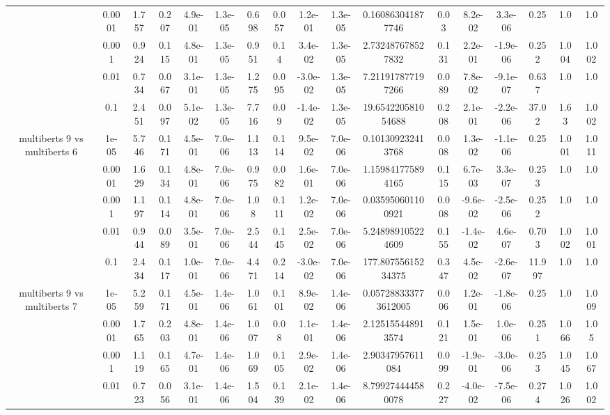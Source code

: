\begin{tabular}{|c|c|c|c|c|c|c|c|c|c|c|c|c|c|c|c|c|}
 & 0.0001 & 1.757 & 0.207 & 4.9e-01 & 1.3e-05 & 0.698 & 0.057 & 1.2e-01 & 1.3e-05 & 0.160863041877746 & 0.03 & 8.2e-02 & 3.3e-06 & 0.25 & 1.0 & 1.0 \\
 & 0.001 & 0.924 & 0.115 & 4.8e-01 & 1.3e-05 & 0.951 & 0.14 & 3.4e-02 & 1.3e-05 & 2.732487678527832 & 0.131 & 2.2e-01 & -1.9e-06 & 0.252 & 1.004 & 1.002 \\
 & 0.01 & 0.734 & 0.067 & 3.1e-01 & 1.3e-05 & 1.275 & 0.095 & -3.0e-02 & 1.3e-05 & 7.211917877197266 & 0.089 & 7.8e-02 & -9.1e-07 & 0.637 & 1.0 & 1.0 \\
 & 0.1 & 2.451 & 0.097 & 5.1e-02 & 1.3e-05 & 7.716 & 0.09 & -1.4e-02 & 1.3e-05 & 19.654220581054688 & 0.208 & 2.1e-01 & -2.2e-06 & 37.02 & 1.63 & 1.002 \\
\hline
\multirow{5}{*}{multiberts 9 vs multiberts 6} & 1e-05 & 5.746 & 0.171 & 4.5e-01 & 7.0e-06 & 1.113 & 0.114 & 9.5e-02 & 7.0e-06 & 0.101309232413768 & 0.008 & 1.3e-02 & -1.1e-06 & 0.25 & 1.001 & 1.011 \\
 & 0.0001 & 1.629 & 0.134 & 4.8e-01 & 7.0e-06 & 0.975 & 0.082 & 1.6e-01 & 7.0e-06 & 1.159841775894165 & 0.115 & 6.7e-03 & 3.3e-07 & 0.253 & 1.0 & 1.0 \\
 & 0.001 & 1.197 & 0.114 & 4.8e-01 & 7.0e-06 & 1.08 & 0.111 & 1.2e-02 & 7.0e-06 & 0.035950601100921 & 0.008 & -9.6e-02 & -2.5e-06 & 0.252 & 1.0 & 1.0 \\
 & 0.01 & 0.944 & 0.089 & 3.5e-01 & 7.0e-06 & 2.544 & 0.145 & 2.5e-02 & 7.0e-06 & 5.248989105224609 & 0.155 & -1.4e-02 & 4.6e-07 & 0.703 & 1.002 & 1.001 \\
 & 0.1 & 2.434 & 0.117 & 1.0e-01 & 7.0e-06 & 4.471 & 0.214 & -3.0e-02 & 7.0e-06 & 177.80755615234375 & 0.347 & 4.5e-02 & -2.6e-07 & 11.997 & 1.0 & 1.0 \\
\hline
\multirow{5}{*}{multiberts 9 vs multiberts 7} & 1e-05 & 5.259 & 0.171 & 4.5e-01 & 1.4e-06 & 1.061 & 0.101 & 8.9e-02 & 1.4e-06 & 0.057288333773612005 & 0.006 & 1.2e-01 & -1.8e-06 & 0.25 & 1.0 & 1.009 \\
 & 0.0001 & 1.765 & 0.203 & 4.8e-01 & 1.4e-06 & 1.007 & 0.08 & 1.1e-01 & 1.4e-06 & 2.125155448913574 & 0.121 & 1.5e-01 & 1.0e-06 & 0.251 & 1.066 & 1.05 \\
 & 0.001 & 1.119 & 0.165 & 4.7e-01 & 1.4e-06 & 1.069 & 0.105 & 2.9e-02 & 1.4e-06 & 2.90347957611084 & 0.099 & -1.9e-01 & -3.0e-06 & 0.253 & 1.045 & 1.067 \\
 & 0.01 & 0.723 & 0.056 & 3.1e-01 & 1.4e-06 & 1.504 & 0.139 & 2.1e-02 & 1.4e-06 & 8.799274444580078 & 0.227 & -4.0e-02 & -7.5e-06 & 0.274 & 1.026 & 1.002 \\

\end{tabular}
